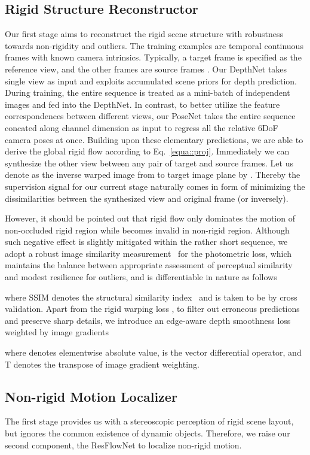 \subsection{Rigid Structure Reconstructor}
\label{sec::static}

Our first stage aims to reconstruct the rigid scene structure with robustness towards non-rigidity and outliers. The training examples are temporal continuous frames  with known camera intrinsics. Typically, a target frame  is specified as the reference view, and the other frames are source frames . Our DepthNet takes single view as input and exploits accumulated scene priors for depth prediction. During training, 
the entire sequence is treated as a mini-batch of independent images and fed into the DepthNet.
In contrast, to better utilize the feature correspondences between different views, our PoseNet takes the entire sequence concated along channel dimension as input to regress all the relative 6DoF camera poses  at once. Building upon these elementary predictions, we are able to derive the global rigid flow according to Eq.~\eqref{equa::proj}. Immediately we can synthesize the other view between any pair of target and source frames. Let us denote  as the inverse warped image from  to target image plane by . 
Thereby the supervision signal for our current stage naturally comes in form of minimizing the dissimilarities between the synthesized view  and original frame  (or inversely).

However, it should be pointed out that rigid flow only dominates the motion of non-occluded rigid region while becomes invalid in non-rigid region. Although such negative effect is slightly mitigated within the rather short sequence, we adopt a robust image similarity measurement~\cite{monodepth17} for the photometric loss, which maintains the balance between appropriate assessment of perceptual similarity and modest resilience for outliers, and is differentiable in nature as follows

where SSIM denotes the structural similarity index~\cite{wang2004image} and  is taken to be  by cross validation. Apart from the rigid warping loss , to filter out erroneous predictions and preserve sharp details, we introduce an edge-aware depth smoothness loss  weighted by image gradients

where  denotes elementwise absolute value,  is the vector differential operator, and T denotes the transpose of image gradient weighting.


\subsection{Non-rigid Motion Localizer}
\label{sec::resflow}
The first stage provides us with a stereoscopic perception of rigid scene layout, but ignores the common existence of dynamic objects. Therefore, we raise our second component, \ie the ResFlowNet to localize non-rigid motion. 

